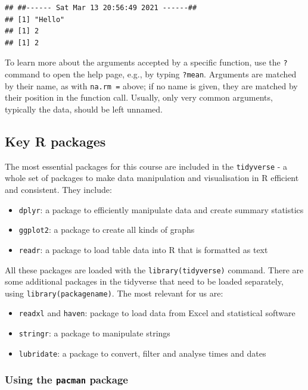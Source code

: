\documentclass[
]{book}
\providecommand{\tightlist}{%
  \setlength{\itemsep}{0pt}\setlength{\parskip}{0pt}}
\begin{document}
\begin{verbatim}
## ##------ Sat Mar 13 20:56:49 2021 ------##
## [1] "Hello"
## [1] 2
## [1] 2
\end{verbatim}

To learn more about the arguments accepted by a specific function, use the \texttt{?} command to open the help page, e.g., by typing \texttt{?mean}. Arguments are matched by their name, as with \texttt{na.rm\ =} above; if no name is given, they are matched by their position in the function call. Usually, only very common arguments, typically the data, should be left unnamed.

\hypertarget{key-r-packages}{%
\subsection{Key R packages}\label{key-r-packages}}

The most essential packages for this course are included in the \texttt{tidyverse} - a whole set of packages to make data manipulation and visualisation in R efficient and consistent. They include:

\begin{itemize}
\tightlist
\item
  \texttt{dplyr}: a package to efficiently manipulate data and create summary statistics
\item
  \texttt{ggplot2}: a package to create all kinds of graphs
\item
  \texttt{readr}: a package to load table data into R that is formatted as text
\end{itemize}

All these packages are loaded with the \texttt{library(tidyverse)} command. There are some additional packages in the tidyverse that need to be loaded separately, using \texttt{library(packagename)}. The most relevant for us are:

\begin{itemize}
\tightlist
\item
  \texttt{readxl} and \texttt{haven}: package to load data from Excel and statistical software
\item
  \texttt{stringr}: a package to manipulate strings
\item
  \texttt{lubridate}: a package to convert, filter and analyse times and dates
\end{itemize}

\hypertarget{using-the-pacman-package}{%
\subsubsection{\texorpdfstring{Using the \texttt{pacman} package}{Using the pacman package}}\label{using-the-pacman-package}}
\end{document}
